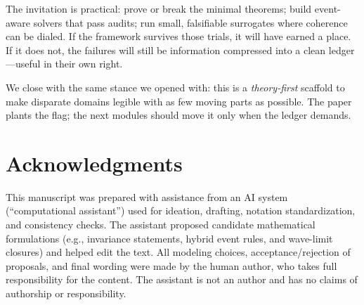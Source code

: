 \documentclass[12pt]{article}
\begin{document}
The invitation is practical: prove or break the minimal theorems; build event-aware solvers that pass audits; run small, falsifiable surrogates where coherence can be dialed. If the framework survives those trials, it will have earned a place. If it does not, the failures will still be information compressed into a clean ledger---useful in their own right.

We close with the same stance we opened with: this is a \emph{theory-first} scaffold to make disparate domains legible with as few moving parts as possible. The paper plants the flag; the next modules should move it only when the ledger demands.


\section*{Acknowledgments}
This manuscript was prepared with assistance from an AI system (``computational assistant'') used for ideation, drafting, notation standardization, and consistency checks. The assistant proposed candidate mathematical formulations (e.g., invariance statements, hybrid event rules, and wave-limit closures) and helped edit the text. All modeling choices, acceptance/rejection of proposals, and final wording were made by the human author, who takes full responsibility for the content. The assistant is not an author and has no claims of authorship or responsibility.



\end{document}
